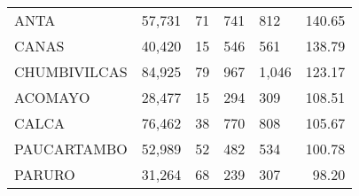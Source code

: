 \begin{tabular}{lrcclr}
	\cellcolor[HTML]{FFFF99}ANTA                                   & 57,731                                                         & 71                                                         & 741                  & 812                                                                 & 140.65                                                                       \\
	\cellcolor[HTML]{FFFF99}CANAS                                  & 40,420                                                         & 15                                                         & 546                  & 561                                                                 & 138.79                                                                       \\
	\cellcolor[HTML]{C6E0B4}CHUMBIVILCAS                           & 84,925                                                         & 79                                                         & 967                  & 1,046                                                               & 123.17                                                                       \\
	\cellcolor[HTML]{C6E0B4}ACOMAYO                                & 28,477                                                         & 15                                                         & 294                  & 309                                                                 & 108.51                                                                       \\
	\cellcolor[HTML]{C6E0B4}CALCA                                  & 76,462                                                         & 38                                                         & 770                  & 808                                                                 & 105.67                                                                       \\
	\cellcolor[HTML]{C6E0B4}PAUCARTAMBO                            & 52,989                                                         & 52                                                         & 482                  & 534                                                                 & 100.78                                                                       \\
	\cellcolor[HTML]{C6E0B4}PARURO                                 & 31,264                                                         & 68                                                         & 239                  & 307                                                                 & 98.20                                                                        \\

\end{tabular}
